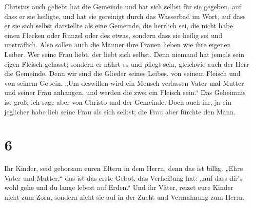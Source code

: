 Christus auch geliebt hat die Gemeinde und hat sich selbst für sie
gegeben,  auf dass er sie heiligte, und hat sie gereinigt
durch das Wasserbad im Wort,  auf dass er sie sich selbst
darstellte als eine Gemeinde, die herrlich sei, die nicht habe einen
Flecken oder Runzel oder des etwas, sondern dass sie heilig sei und
unsträflich.  Also sollen auch die Männer ihre Frauen
lieben wie ihre eigenen Leiber. Wer seine Frau liebt, der liebt sich
selbst.  Denn niemand hat jemals sein eigen Fleisch
gehasst; sondern er nährt es und pflegt sein, gleichwie auch der Herr
die Gemeinde.  Denn wir sind die Glieder seines Leibes,
von seinem Fleisch und von seinem Gebein.  „Um deswillen
wird ein Mensch verlassen Vater und Mutter und seiner Frau anhangen, und
werden die zwei ein Fleisch sein.``  Das Geheimnis ist
groß; ich sage aber von Christo und der Gemeinde.  Doch
auch ihr, ja ein jeglicher habe lieb seine Frau als sich selbst; die
Frau aber fürchte den Mann.

\hypertarget{section-5}{%
\section{6}\label{section-5}}

 Ihr Kinder, seid gehorsam euren Eltern in dem Herrn, denn
das ist billig.  „Ehre Vater und Mutter,`` das ist das
erste Gebot, das Verheißung hat:  „auf dass dir's wohl
gehe und du lange lebest auf Erden.``  Und ihr Väter,
reizet eure Kinder nicht zum Zorn, sondern zieht sie auf in der Zucht
und Vermahnung zum Herrn.

